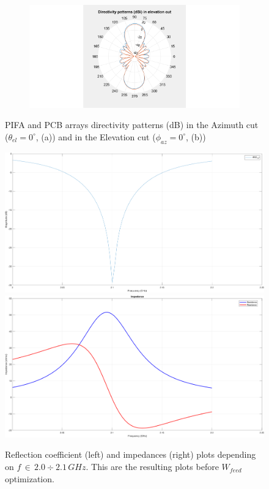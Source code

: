 \documentclass[12pt,a4paper,twocolumn]{article}
\begin{document}
{\begin{figure}[h]
\begin{center}
\begin{subfigure}{0.5\linewidth}
			\includegraphics[scale=0.3]{pifa_pcb_array_elevation_comparison.pdf}
			\caption{}	\end{subfigure}
		\caption{
			PIFA and PCB arrays directivity patterns (dB) in the Azimuth cut  ($\theta_{el}=0^\circ$, (a)) and in the Elevation cut ($\phi_{az}=0^\circ$, (b))}
	\end{center}  
\end{figure}

\begin{center}
	\begin{figure}
		\includegraphics[width = 0.5\linewidth]{gamma.png}
		\includegraphics[width = 0.5\linewidth]{impedances.png}
		\caption{Reflection coefficient (left) and impedances (right) plots depending on $f\,\in\,2.0\div 2.1\,GHz$. This are the resulting plots before $W_{feed}$ optimization. }
	\end{figure}
\end{center}

}
\end{document}
